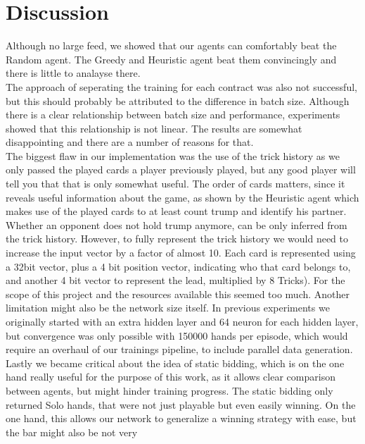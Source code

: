 \chapter{Discussion}
Although no large feed, we showed that our agents can comfortably beat the Random agent.
The Greedy and Heuristic agent beat them convincingly and there is little to analayse there.\\
The approach of seperating the training for each contract was also not successful, but this should probably be
attributed to the difference in batch size.
Although there is a clear relationship between batch size and performance, experiments showed that this relationship
is not linear.
\newline
The results are somewhat disappointing and there are a number of reasons for that.\\
The biggest flaw in our implementation was the use of the trick history as we only passed the played cards a player
previously played, but any good player will tell you that that is only somewhat useful.
The order of cards matters, since it reveals useful information about the game, as shown by the Heuristic agent which
makes use of the played cards to at least count trump and identify his partner.\\
Whether an opponent does not hold trump anymore, can be only inferred from the trick history.
However, to fully represent the trick history we would need to increase the input vector by a factor of almost
10.
Each card is represented using a 32bit vector, plus a 4 bit position vector, indicating who that card belongs to, and
another 4 bit vector to represent the lead, multiplied by 8 Tricks).
For the scope of this project and the resources available this seemed too much.
\newline
\newline
Another limitation might also be the network size itself.
In previous experiments we originally started with an extra hidden layer and 64 neuron for each hidden layer, but
convergence was only possible with 150000 hands per episode, which would require an overhaul of our trainings
pipeline, to include parallel data generation.
\newline
Lastly we became critical about the idea of static bidding, which is on the one hand really useful for the purpose of
this work, as it allows clear comparison between agents, but might hinder training progress.
The static bidding only returned Solo hands, that were not just playable but even easily winning.
On the one hand, this allows our network to generalize a winning strategy with ease, but the bar might also be not very
